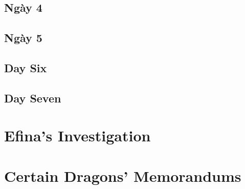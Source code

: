 \documentclass[13pt]{extarticle}
\begin{document}
	\subsection*{Ngày 4}
	
	
	\subsection*{Ngày 5}
	

	\subsection*{Day Six}

	\subsection*{Day Seven}

	
	\section{Efina’s Investigation}
	
	\section{Certain Dragons’ Memorandums}
	
	
\end{document}
